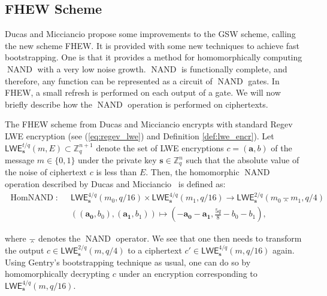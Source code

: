 \subsection{FHEW Scheme}\label{sec:fhew}

Ducas and Micciancio \cite{cite:fhew} propose some improvements to the GSW scheme, calling the new scheme FHEW. It is provided with some new techniques to achieve fast bootstrapping. One is that it provides a method for homomorphically computing $\operatorname{NAND}$ with a very low noise growth. $\operatorname{NAND}$ is functionally complete, and therefore, any function can be represented as a circuit of $\operatorname{NAND}$ gates. In FHEW, a small refresh is performed on each output of a gate. We will now briefly describe how the $\operatorname{NAND}$ operation is performed on ciphertexts.

The FHEW scheme from Ducas and Micciancio \cite{cite:fhew} encrypts with standard Regev LWE encryption (see (\ref{eq:regev_lwe}) and Definition \ref{def:lwe_encr}). Let $\mathsf{LWE}_{\mathbf{s}}^{t/q}(m,E) \subset \mathbb{Z}_q^{n+1}$ denote the set of LWE encryptions $c = (\mathbf{a}, b)$ of the message $m \in \{0,1\}$ under the private key $\mathbf{s} \in \mathbb{Z}_q^n$ such that the absolute value of the noise of ciphertext $c$ is less than $E$. Then, the homomorphic $\operatorname{NAND}$ operation described by Ducas and Micciancio~\cite{cite:fhew} is defined as:
\begin{align*}
    \operatorname{HomNAND}: \;\; &\mathsf{LWE}_{\mathbf{s}}^{4/q}(m_0, q/16) \times \mathsf{LWE}_{\mathbf{s}}^{4/q}(m_1, q/16) \to \mathsf{LWE}_{\mathbf{s}}^{2/q}(m_0 \barwedge m_1, q/4) \\
    &((\mathbf{a_0}, b_0), (\mathbf{a_1}, b_1)) \mapsto \left(-\mathbf{a_0}-\mathbf{a_1}, \frac{5q}{8} - b_0 - b_1\right),
\end{align*}

where $\barwedge$ denotes the $\operatorname{NAND}$ operator. We see that one then needs to transform the output $c \in \mathsf{LWE}_{\mathbf{s}}^{2/q}(m, q/4)$ to a ciphertext $c' \in \mathsf{LWE}_{\mathbf{s}}^{4/q}(m, q/16)$ again. Using Gentry's bootstrapping technique \cite{cite:gentry1} as usual, one can do so by homomorphically decrypting $c$ under an encryption corresponding to $\mathsf{LWE}_{\mathbf{s}}^{4/q}(m, q/16)$.

